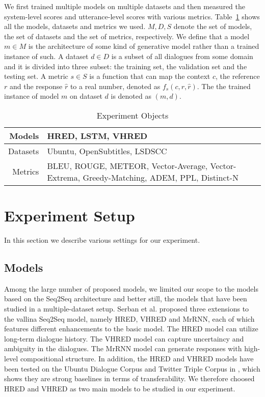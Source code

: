 \documentclass[runningheads]{llncs}
\begin{document}
We first trained multiple models on multiple datasets and then measured the
system-level scores and utterance-level scores with various metrics.
Table~\ref{tab:experiment_triples} shows all the models, datasets and
metrics we used. $M, D, S$ denote the set of models, the set of datasets and
the set of metrics, respectively. We define that a model $m \in M$ is
the architecture of some kind of generative model rather than a trained
instance of such. A dataset $d \in D$ is a subset of all dialogues from
some domain and it is divided into three subset: the training set, the
validation set and the testing set. A metric $s \in S$ is a function that
can map the context $c$, the reference $r$ and the response $\hat{r}$
to a real number, denoted as $f_s(c, r, \hat{r})$.
The the trained instance of model $m$ on dataset $d$ is denoted as $(m, d)$.
\begin{table}[H]
    \centering
    \caption{Experiment Objects}
    \label{tab:experiment_triples}
    \begin{tabular}{|r|m{}|}
        \hline
        Models & HRED, LSTM, VHRED \\
        \hline
        Datasets & Ubuntu, OpenSubtitles, LSDSCC \\
        \hline
        Metrics & BLEU, ROUGE, METEOR, Vector-Average,
        Vector-Extrema, Greedy-Matching,
        ADEM, PPL, Distinct-N \\
        \hline
    \end{tabular}
\end{table}

\section{Experiment Setup}
In this section we describe various settings for our experiment.

\subsection{Models}
Among the large number of proposed models, we limited our scope to
the models based on the Seq2Seq architecture and better still, the models
that have been studied in a multiple-dataset setup.
Serban et al. proposed three extensions to the vallina Seq2Seq model,
namely HRED\cite{HRED}, VHRED\cite{VHRED} and MrRNN\cite{MrRNN}, each of which
features different enhancements to the basic model\cite{A_Short_Review}.
The HRED model can utilize long-term dialogue history.
The VHRED model can capture uncertaincy and ambiguity in the dialogues.
The MrRNN model can generate responses with high-level compositional structure.
In addition, the HRED and VHRED models have been tested on the Ubuntu Dialogue Corpus
and Twitter Triple Corpus in \cite{VHRED}, which shows they are strong baselines
in terms of transferability. We therefore choosed HRED and VHRED as two main models to
be studied in our experiment.
\end{document}
